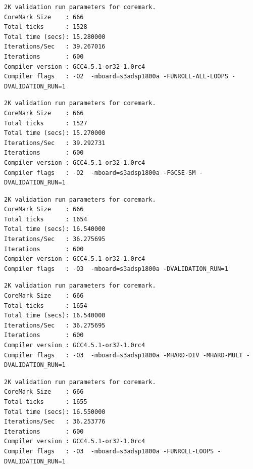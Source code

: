 \begin{lstlisting}[frame=single,caption={Optimización nivel -O2 - Flags activos : -FUNROLL-ALL-LOOPS},label={lst:salidas},breaklines]
2K validation run parameters for coremark.
CoreMark Size    : 666
Total ticks      : 1528
Total time (secs): 15.280000
Iterations/Sec   : 39.267016
Iterations       : 600
Compiler version : GCC4.5.1-or32-1.0rc4
Compiler flags   : -O2  -mboard=s3adsp1800a -FUNROLL-ALL-LOOPS -DVALIDATION_RUN=1  
\end{lstlisting}

\begin{lstlisting}[frame=single,caption={Optimización nivel -O2 - Flags activos : -FGCSE-SM},label={lst:salidas},breaklines]
2K validation run parameters for coremark.
CoreMark Size    : 666
Total ticks      : 1527
Total time (secs): 15.270000
Iterations/Sec   : 39.292731
Iterations       : 600
Compiler version : GCC4.5.1-or32-1.0rc4
Compiler flags   : -O2  -mboard=s3adsp1800a -FGCSE-SM -DVALIDATION_RUN=1  
\end{lstlisting}

\begin{lstlisting}[frame=single,caption={Optimización nivel -O3 - Sin Flags activos},label={lst:salidas},breaklines]
2K validation run parameters for coremark.
CoreMark Size    : 666
Total ticks      : 1654
Total time (secs): 16.540000
Iterations/Sec   : 36.275695
Iterations       : 600
Compiler version : GCC4.5.1-or32-1.0rc4
Compiler flags   : -O3  -mboard=s3adsp1800a -DVALIDATION_RUN=1  
\end{lstlisting}

\begin{lstlisting}[frame=single,caption={Optimización nivel -O3 - Flags activos -MHARD-DIV -MHARD-MULT},label={lst:salidas},breaklines]
2K validation run parameters for coremark.
CoreMark Size    : 666
Total ticks      : 1654
Total time (secs): 16.540000
Iterations/Sec   : 36.275695
Iterations       : 600
Compiler version : GCC4.5.1-or32-1.0rc4
Compiler flags   : -O3  -mboard=s3adsp1800a -MHARD-DIV -MHARD-MULT -DVALIDATION_RUN=1  
\end{lstlisting}

\begin{lstlisting}[frame=single,caption={Optimización nivel -O3 - Flags activos -FUNROLL-LOOPS},label={lst:salidas},breaklines]
2K validation run parameters for coremark.
CoreMark Size    : 666
Total ticks      : 1655
Total time (secs): 16.550000
Iterations/Sec   : 36.253776
Iterations       : 600
Compiler version : GCC4.5.1-or32-1.0rc4
Compiler flags   : -O3  -mboard=s3adsp1800a -FUNROLL-LOOPS -DVALIDATION_RUN=1  
\end{lstlisting}

